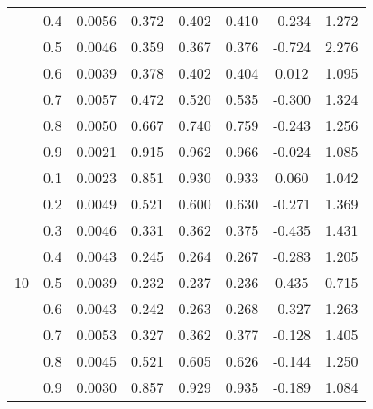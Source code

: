 \documentclass[11pt,a4paper]{report}
\begin{document}
\begin{longtable}{ | c | c || c | c | c | c | c | c | }
 & 0.4 & 0.0056 & 0.372 & 0.402 & 0.410 & -0.234 & 1.272 \\
 & 0.5 & 0.0046 & 0.359 & 0.367 & 0.376 & -0.724 & 2.276 \\
 & 0.6 & 0.0039 & 0.378 & 0.402 & 0.404 & 0.012 & 1.095 \\
 & 0.7 & 0.0057 & 0.472 & 0.520 & 0.535 & -0.300 & 1.324 \\
 & 0.8 & 0.0050 & 0.667 & 0.740 & 0.759 & -0.243 & 1.256 \\
 & 0.9 & 0.0021 & 0.915 & 0.962 & 0.966 & -0.024 & 1.085 \\
 \hline
\multirow{9}{*}{10} & 0.1 & 0.0023 & 0.851 & 0.930 & 0.933 & 0.060 & 1.042 \\
 & 0.2 & 0.0049 & 0.521 & 0.600 & 0.630 & -0.271 & 1.369 \\
 & 0.3 & 0.0046 & 0.331 & 0.362 & 0.375 & -0.435 & 1.431 \\
 & 0.4 & 0.0043 & 0.245 & 0.264 & 0.267 & -0.283 & 1.205 \\
 & 0.5 & 0.0039 & 0.232 & 0.237 & 0.236 & 0.435 & 0.715 \\
 & 0.6 & 0.0043 & 0.242 & 0.263 & 0.268 & -0.327 & 1.263 \\
 & 0.7 & 0.0053 & 0.327 & 0.362 & 0.377 & -0.128 & 1.405 \\
 & 0.8 & 0.0045 & 0.521 & 0.605 & 0.626 & -0.144 & 1.250 \\
 & 0.9 & 0.0030 & 0.857 & 0.929 & 0.935 & -0.189 & 1.084 \\
 \hline
\hline
\end{longtable}
\end{document}
